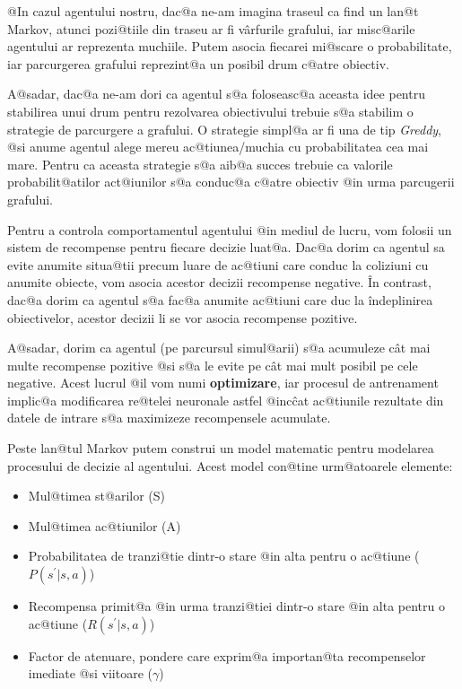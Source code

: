 @In cazul agentului nostru, dac@a ne-am imagina traseul ca find un lan@t Markov, atunci pozi@tiile din traseu ar fi v\^ arfurile grafului, iar misc@arile agentului ar reprezenta muchiile. Putem asocia fiecarei mi@scare o probabilitate, iar parcurgerea grafului reprezint@a un posibil drum c@atre obiectiv.

A@sadar, dac@a ne-am dori ca agentul s@a foloseasc@a aceasta idee pentru stabilirea unui drum pentru rezolvarea obiectivului trebuie s@a stabilim o strategie de parcurgere a grafului.
O strategie simpl@a ar fi una de tip {\sl Greddy}, @si anume agentul alege mereu ac@tiunea/muchia cu probabilitatea cea mai mare. Pentru ca aceasta strategie s@a aib@a succes trebuie ca valorile probabilit@atilor act@iunilor s@a conduc@a c@atre obiectiv @in urma parcugerii grafului.

Pentru a controla comportamentul agentului @in mediul de lucru, vom folosii un sistem de recompense pentru fiecare decizie luat@a. Dac@a dorim ca agentul sa evite anumite situa@tii precum luare de ac@tiuni care conduc la coliziuni cu anumite obiecte, vom asocia acestor decizii recompense negative. \^In contrast, dac@a dorim ca agentul s@a fac@a anumite ac@tiuni care duc la \^indeplinirea obiectivelor, acestor decizii li se vor asocia recompense pozitive.

A@sadar, dorim ca agentul (pe parcursul simul@arii) s@a acumuleze c\^ at mai multe recompense pozitive @si s@a le evite pe c\^ at mai mult posibil pe cele negative. Acest lucrul @il vom numi \textbf{optimizare}, iar procesul de antrenament implic@a modificarea re@telei neuronale astfel @inc\^ cat ac@tiunile rezultate din datele de intrare s@a maximizeze recompensele acumulate.

Peste lan@tul Markov putem construi un model matematic pentru modelarea procesului de decizie al agentului. Acest model con@tine urm@atoarele elemente:

\begin{itemize}
	\item Mul@timea st@arilor (S)
	\item Mul@timea ac@tiunilor (A)
	\item Probabilitatea de tranzi@tie dintr-o stare @in alta pentru o ac@tiune ($P(s^{\prime}|s, a)$)
	\item Recompensa primit@a @in urma tranzi@tiei dintr-o stare @in alta pentru o ac@tiune ($R(s^{\prime}|s, a)$)
	\item Factor de atenuare, pondere care exprim@a importan@ta recompenselor imediate @si viitoare ($\gamma$)
\end{itemize}

